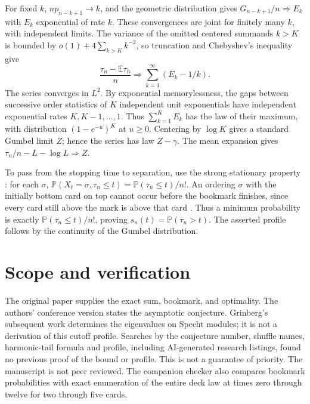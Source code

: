 \documentclass[11pt]{article}
\newcommand{\E}{\mathbb E}
\newcommand{\Prb}{\mathbb P}
\begin{document}
For fixed $k$, $np_{n-k+1}\to k$, and the geometric distribution gives $G_{n-k+1}/n\Rightarrow E_k$ with $E_k$ exponential of rate $k$. These convergences are joint for finitely many $k$, with independent limits. The variance of the omitted centered summands $k>K$ is bounded by $o(1)+4\sum_{k>K}k^{-2}$, so truncation and Chebyshev's inequality give
\[
 \frac{\tau_n-\E\tau_n}{n}\Rightarrow\sum_{k=1}^\infty(E_k-1/k).
\]
The series converges in $L^2$. By exponential memorylessness, the gaps between successive order statistics of $K$ independent unit exponentials have independent exponential rates $K,K-1,\ldots,1$. Thus $\sum_{k=1}^K E_k$ has the law of their maximum, with distribution $(1-e^{-u})^K$ at $u\ge0$. Centering by $\log K$ gives a standard Gumbel limit $Z$; hence the series has law $Z-\gamma$. The mean expansion gives $\tau_n/n-L-\log L\Rightarrow Z$.

To pass from the stopping time to separation, use the strong stationary property \cite[\S15.2]{GL}: for each $\sigma$, $\Prb(X_t=\sigma,\tau_n\le t)=\Prb(\tau_n\le t)/n!$. An ordering $\sigma$ with the initially bottom card on top cannot occur before the bookmark finishes, since every card still above the mark is above that card \cite[\S15.4]{GL}. Thus a minimum probability is exactly $\Prb(\tau_n\le t)/n!$, proving $s_n(t)=\Prb(\tau_n>t)$. The asserted profile follows by the continuity of the Gumbel distribution.

\section*{Scope and verification}
The original paper supplies the exact sum, bookmark, and optimality. The authors' conference version \cite{GLfpsac} states the asymptotic conjecture. Grinberg's subsequent work \cite{G} determines the eigenvalues on Specht modules; it is not a derivation of this cutoff profile. Searches by the conjecture number, shuffle names, harmonic-tail formula and profile, including AI-generated research listings, found no previous proof of the bound or profile. This is not a guarantee of priority. The manuscript is not peer reviewed. The companion checker also compares bookmark probabilities with exact enumeration of the entire deck law at times zero through twelve for two through five cards.
\appendix
\end{document}
